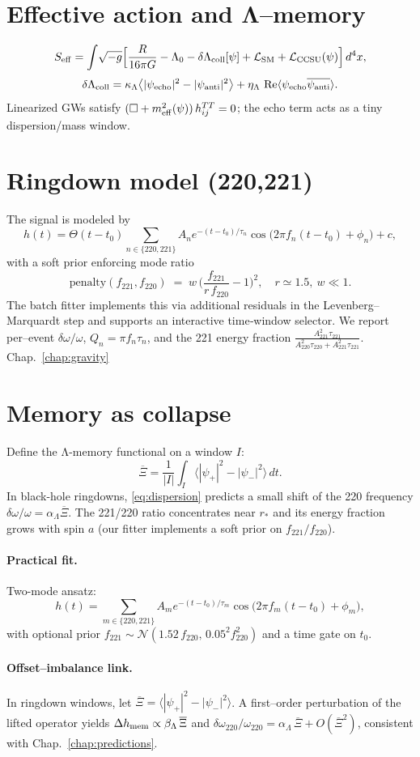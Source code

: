 \section*{Effective action and Λ–memory}
\begin{equation}
S_{\mathrm{eff}}=\int\!\sqrt{-g}\Big[\frac{R}{16\pi G}-\Lambda_0-\delta\Lambda_{\mathrm{coll}}[\psi]
+\mathcal{L}_{\mathrm{SM}}+\mathcal{L}_{\mathrm{CCSU}}(\psi)\Big]\,d^4x,
\end{equation}
\[
\delta\Lambda_{\mathrm{coll}}
=\kappa_\Lambda\big\langle|\psi_{\rm echo}|^2-|\psi_{\rm anti}|^2\big\rangle
+\eta_\Lambda\,\Re\langle\psi_{\rm echo}\overline{\psi_{\rm anti}}\rangle .
\]
Linearized GWs satisfy $(\Box+m_{\rm eff}^2(\psi))\,h^{TT}_{ij}=0$; the echo term acts as a tiny dispersion/mass window.

\section*{Ringdown model (220,221)}
The signal is modeled by
\[
h(t)=\Theta(t-t_0)\sum_{n\in\{220,221\}} A_n e^{-(t-t_0)/\tau_n}
\cos\!\big(2\pi f_n(t-t_0)+\phi_n\big)+c,
\]
with a soft prior enforcing mode ratio
\[
\text{penalty}(f_{221},f_{220}) \;=\; w\,\Big(\frac{f_{221}}{r\,f_{220}}-1\Big)^2,
\quad r\simeq 1.5,\ w\ll 1.
\]
The batch fitter implements this via additional residuals in the Levenberg–Marquardt step and supports an interactive time‐window selector. We report per–event
$\delta\omega/\omega$, $Q_n=\pi f_n\tau_n$, and the 221 energy fraction
$\tfrac{A_{221}^2\tau_{221}}{A_{220}^2\tau_{220}+A_{221}^2\tau_{221}}$.
Chap.~\ref{chap:gravity}

\section{Memory as collapse}
Define the Λ-memory functional on a window $I$:
\[
\overline{\Xi} = \frac{1}{|I|}\int_I \langle |\psi_+|^2-|\psi_-|^2\rangle\,dt .
\]
In black-hole ringdowns, \eqref{eq:dispersion} predicts a small shift of the 220 frequency $\delta\omega/\omega=\alpha_\Lambda \overline{\Xi}$. The 221/220 ratio concentrates near $r_*$ and its energy fraction grows with spin $a$ (our fitter implements a soft prior on $f_{221}/f_{220}$).

\paragraph{Practical fit.}
Two-mode ansatz:
\[
h(t)=\sum_{m\in\{220,221\}}A_m e^{-(t-t_0)/\tau_m}\cos\!\big(2\pi f_m (t-t_0)+\phi_m\big),
\]
with optional prior $f_{221}\sim\mathcal{N}(1.52\,f_{220},\,0.05^2 f_{220}^2)$ and a time gate on $t_0$.
\paragraph{Offset–imbalance link.}
In ringdown windows, let $\overline{\Xi}=\langle|\psi_+|^2-|\psi_-|^2\rangle$.
A first–order perturbation of the lifted operator yields
$\Delta h_{\rm mem}\propto \beta_\Lambda\,\overline{\Xi}$ and
$\delta\omega_{220}/\omega_{220}=\alpha_\Lambda\,\overline{\Xi}+O(\overline{\Xi}^2)$,
consistent with Chap.~\ref{chap:predictions}.
